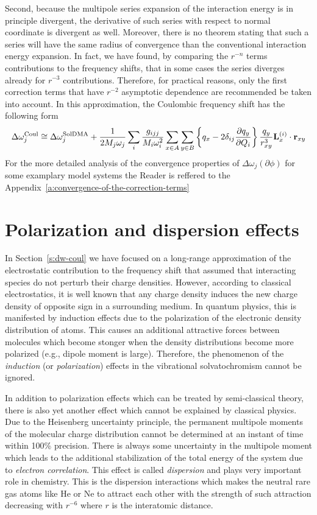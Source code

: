 \documentclass[a4paper,titlepage,twoside,fleqn,12pt]{book}
\newcommand{\fderiv}[2]{\ensuremath{
\frac{\partial #1}{\partial #2}}}
\begin{document}
\begin{refsection}
Second, because the multipole series expansion of the interaction energy
is in principle divergent, the derivative of such series
with respect to normal coordinate is divergent as well. Moreover, 
there is no theorem stating that such a series will have the same radius of convergence
than the conventional interaction energy expansion. In fact,
we have found, by comparing the $r^{-n}$ terms contributions to the frequency
shifts, that in some cases the series diverges already for 
$r^{-3}$ contributions. Therefore, for practical reasons, only
the first correction terms that have $r^{-2}$ asymptotic dependence
are recommended be taken into account. In this approximation,
the Coulombic frequency shift has the following form
%
\begin{equation} \label{e:dw-solefp-coul-working}
\Delta\omega_j^{\rm Coul} \cong \Delta\omega_j^{\rm SolDMA} + \frac{1}{2M_j\omega_j}
\sum_i \frac{g_{ijj}}{M_i\omega_i^2} \sum_{x \in A}\sum_{y \in B}
\left\{ q_x - 2\delta_{ij} \fderiv{q_y}{Q_i} \right\} \frac{q_y}{r_{xy}^3} {\bf L}_x^{(i)} \cdot {\bf r}_{xy} 
\end{equation}
%
For the more detailed analysis of the convergence properties
of $\Delta\omega_j({\partial\phi})$ for some examplary model 
systems the Reader is reffered to
the Appendix~\ref{a:convergence-of-the-correction-terms}


\section{Polarization and dispersion effects}

In Section~\ref{s:dw-coul} we have focused on a long\hyp{}range
approximation of the electrostatic contribution to the frequency
shift that assumed that interacting species do not perturb
their charge densities. However, according to classical electrostatics,
it is well known that any charge density induces the new
charge density of opposite sign in a surrounding medium. In quantum
physics, this is manifested by induction effects due to the polarization
of the electronic density distribution of atoms. This causes
an additional attractive forces between molecules which
become stonger when the density distributions become more polarized
(e.g., dipole moment is large). Therefore, the
phenomenon of the \emph{induction} (or \emph{polarization}) effects
in the vibrational solvatochromism cannot be ignored.

In addition to polarization effects which can be treated
by semi\hyp{}classical theory, there is also yet another effect
which cannot be explained by classical physics. Due to the Heisenberg
uncertainty principle, the permanent multipole moments of the 
molecular charge distribution cannot be determined at an instant
of time within 100\% precision. There is always some uncertainty
in the multipole moment which leads to the additional stabilization
of the total energy of the system due to \emph{electron correlation}. This effect is
called \emph{dispersion} and plays very important role in chemistry.
This is the dispersion interactions which makes the neutral rare gas atoms 
like He or Ne
to attract each other with the strength of such attraction decreasing
with $r^{-6}$ where $r$ is the interatomic distance.


\end{refsection}
\end{document}
